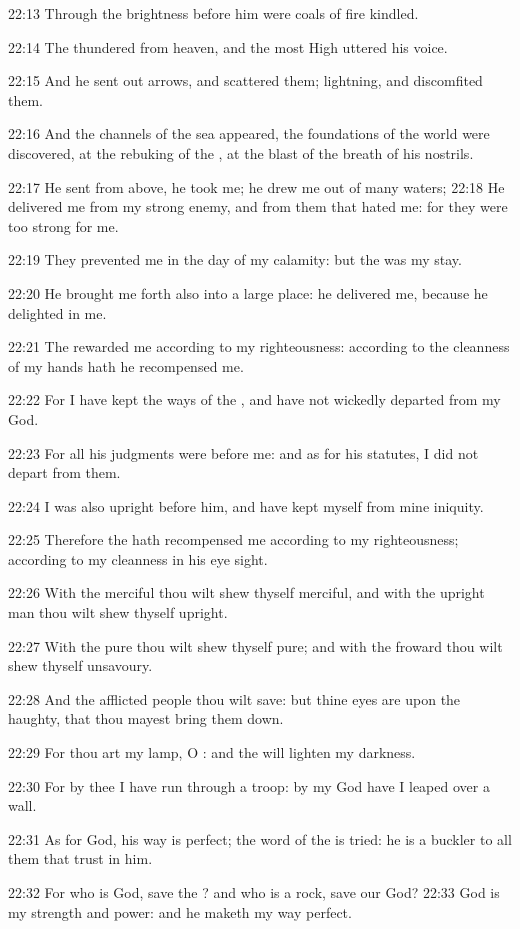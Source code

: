 22:13 Through the brightness before him were coals of fire kindled.

22:14 The \LORD thundered from heaven, and the most High uttered his
voice.

22:15 And he sent out arrows, and scattered them; lightning, and
discomfited them.

22:16 And the channels of the sea appeared, the foundations of the
world were discovered, at the rebuking of the \LORD, at the blast of
the breath of his nostrils.

22:17 He sent from above, he took me; he drew me out of many waters;
22:18 He delivered me from my strong enemy, and from them that hated
me: for they were too strong for me.

22:19 They prevented me in the day of my calamity: but the \LORD was my
stay.

22:20 He brought me forth also into a large place: he delivered me,
because he delighted in me.

22:21 The \LORD rewarded me according to my righteousness: according to
the cleanness of my hands hath he recompensed me.

22:22 For I have kept the ways of the \LORD, and have not wickedly
departed from my God.

22:23 For all his judgments were before me: and as for his statutes, I
did not depart from them.

22:24 I was also upright before him, and have kept myself from mine
iniquity.

22:25 Therefore the \LORD hath recompensed me according to my
righteousness; according to my cleanness in his eye sight.

22:26 With the merciful thou wilt shew thyself merciful, and with the
upright man thou wilt shew thyself upright.

22:27 With the pure thou wilt shew thyself pure; and with the froward
thou wilt shew thyself unsavoury.

22:28 And the afflicted people thou wilt save: but thine eyes are upon
the haughty, that thou mayest bring them down.

22:29 For thou art my lamp, O \LORD: and the \LORD will lighten my
darkness.

22:30 For by thee I have run through a troop: by my God have I leaped
over a wall.

22:31 As for God, his way is perfect; the word of the \LORD is tried:
he is a buckler to all them that trust in him.

22:32 For who is God, save the \LORD? and who is a rock, save our God?
22:33 God is my strength and power: and he maketh my way perfect.

